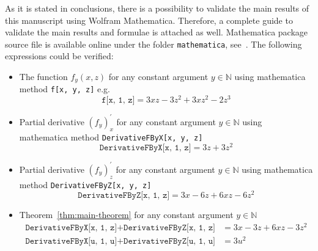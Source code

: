 As it is stated in conclusions, there is a possibility to validate the main results of this manuscript using
Wolfram Mathematica.
Therefore, a complete guide to validate the main results and formulae is attached as well.
Mathematica package source file is available online under the folder \texttt{mathematica}, see~\cite{kolosov2022another}.
The following expressions could be verified:
\begin{itemize}
    \item The function $f_y(x,z)$ for any constant argument $y\in\mathbb{N}$ using mathematica method \texttt{f[x, y, z]} e.g.
    \[
        \texttt{f[x, 1, z]} = 3 x z - 3 z^2 + 3 x z^2 - 2 z^3
    \]
    \item Partial derivative $(f_y)^{'}_x$ for any constant argument $y\in\mathbb{N}$ using mathematica
    method \texttt{DerivativeFByX[x, y, z]}
    \[
        \texttt{DerivativeFByX[x, 1, z]} = 3 z + 3 z^2
    \]
    \item Partial derivative $(f_y)^{'}_z$ for any constant argument $y\in\mathbb{N}$ using mathematica
    method \texttt{DerivativeFByZ[x, y, z]}
    \[
        \texttt{DerivativeFByZ[x, 1, z]} = 3 x - 6 z + 6 x z - 6 z^2
    \]
    \item Theorem~\ref{thm:main-theorem} for any constant argument $y\in\mathbb{N}$
    \begin{align*}
        \texttt{DerivativeFByX[x, 1, z]} + \texttt{DerivativeFByZ[x, 1, z]} &= 3 x - 3 z + 6 x z - 3 z^2 \\
        \texttt{DerivativeFByX[u, 1, u]} + \texttt{DerivativeFByZ[u, 1, u]} &= 3 u^2
    \end{align*}
\end{itemize}